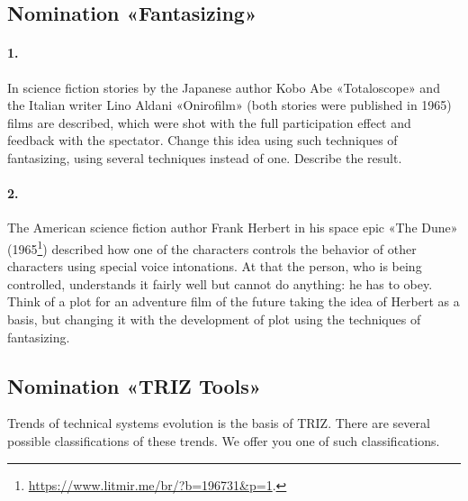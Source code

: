 \documentclass[11pt,a4paper]{article}
\begin{document}
\subsection*{Nomination «Fantasizing»}

\paragraph{1.}
In science fiction stories by the Japanese author Kobo Abe «Totaloscope» and
the Italian writer Lino Aldani «Onirofilm» (both stories were published in
1965) films are described, which were shot with the full participation effect
and feedback with the spectator.  Change this idea using such techniques of
fantasizing, using several techniques instead of one.  Describe the result.

\paragraph{2.}
The American science fiction author Frank Herbert in his space epic «The Dune»
(1965\footnote{\url{https://www.litmir.me/br/?b=196731&p=1}.}) described how
one of the characters controls the behavior of other characters using special
voice intonations. At that the person, who is being controlled, understands it
fairly well but cannot do anything: he has to obey. Think of a plot for an
adventure film of the future taking the idea of Herbert as a basis, but
changing it with the development of plot using the techniques of fantasizing.

\subsection*{Nomination «TRIZ Tools»}

Trends of technical systems evolution is the basis of TRIZ. There are several
possible classifications of these trends. We offer you one of such
classifications.
\end{document}
